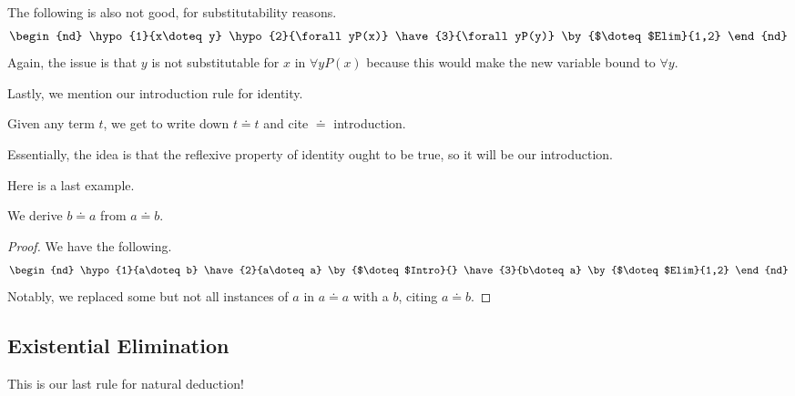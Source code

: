 \documentclass[../notes.tex]{subfiles}
\begin{document}
\begin{nex}
	The following is also not good, for substitutability reasons.
	\begin{align*}
		\begin{nd}
			\hypo{1}{x\doteq y}
			\hypo{2}{\forall yP(x)}
			\have{3}{\forall yP(y)} \by{$\doteq $Elim}{1,2}
		\end{nd}
	\end{align*}
	Again, the issue is that $y$ is not substitutable for $x$ in $\forall yP(x)$ because this would make the new variable bound to $\forall y$.
\end{nex}
Lastly, we mention our introduction rule for identity.
\begin{defihelper} 
	Given any term $t$, we get to write down $t\doteq t$ and cite $\doteq$ introduction.
\end{defihelper}
Essentially, the idea is that the reflexive property of identity ought to be true, so it will be our introduction.

Here is a last example.
\begin{exe}[Symmetry]
	We derive $b\doteq a$ from $a\doteq b$.
\end{exe}
\begin{proof}
	We have the following.
	\begin{align*}
		\begin{nd}
			\hypo{1}{a\doteq b}
			\have{2}{a\doteq a} \by{$\doteq$Intro}{}
			\have{3}{b\doteq a} \by{$\doteq$Elim}{1,2}
		\end{nd}
	\end{align*}
	Notably, we replaced some but not all instances of $a$ in $a\doteq a$ with a $b$, citing $a\doteq b$.
\end{proof}

\subsection{Existential Elimination}
This is our last rule for natural deduction!
\end{document}
